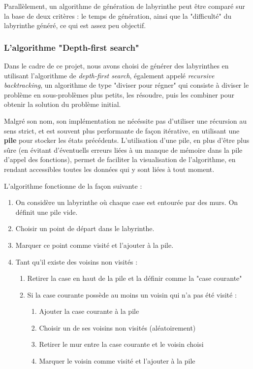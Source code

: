 \documentclass[12pt]{scrreprt} %
\begin{document}
Parallèlement, un algorithme de génération de labyrinthe peut être comparé sur la base de deux critères : le temps de génération, ainsi que la "difficulté" du labyrinthe généré, ce qui est assez peu objectif.

\subsubsection{L'algorithme "Depth-first search"}

Dans le cadre de ce projet, nous avons choisi de générer des labyrinthes en utilisant l'algorithme de \textit{depth-first search}, également appelé \textit{recursive backtracking}, un algorithme de type "diviser pour régner" qui consiste à diviser le problème en sous-problèmes plus petits, les résoudre, puis les combiner pour obtenir la solution du problème initial.

Malgré son nom, son implémentation ne nécéssite pas d'utiliser une récursion au sens strict, et est souvent plus performante de façon itérative, en utilisant une \textbf{pile} pour stocker les états précédents. L'utilisation d'une pile, en plus d'être plus sûre (en évitant d'éventuells erreurs liées à un manque de mémoire dans la pile d'appel des fonctions), permet de faciliter la visualisation de l'algorithme, en rendant accessibles toutes les données qui y sont liées à tout moment.

L'algorithme fonctionne de la façon suivante :

\begin{enumerate}
    \item On considère un labyrinthe où chaque case est entourée par des murs. On définit une pile vide.
    \item Choisir un point de départ dans le labyrinthe.
    \item Marquer ce point comme visité et l'ajouter à la pile.
    \item Tant qu'il existe des voisins non visités :
          \begin{enumerate}
              \item Retirer la case en haut de la pile et la définir comme la "case courante"
              \item Si la case courante possède au moins un voisin qui n'a pas été visité :
                    \begin{enumerate}
                        \item Ajouter la case courante à la pile
                        \item Choisir un de ses voisins non visités (aléatoirement)
                        \item Retirer le mur entre la case courante et le voisin choisi
                        \item Marquer le voisin comme visité et l'ajouter à la pile
                    \end{enumerate}
          \end{enumerate}
\end{enumerate}
\end{document}
